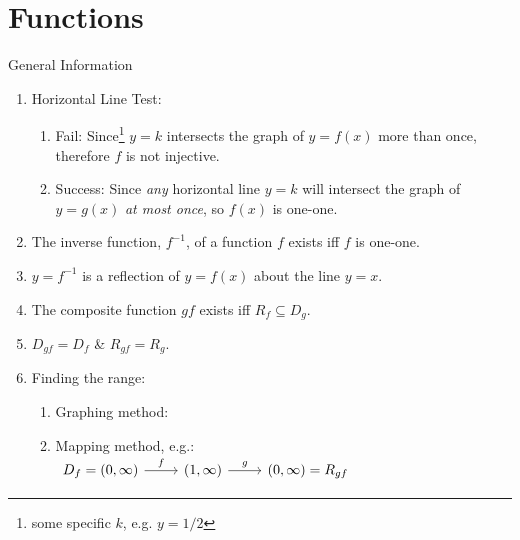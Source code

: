 \documentclass[oneside]{book}
\begin{document}
\chapter{Functions}
\begin{stbox}{General Information}
  \begin{enumerate}
    \item Horizontal Line Test: 
    \begin{enumerate}
      \item Fail: Since\footnote{some specific \(k\), e.g. \(y=1/2\)} \(y=k\) intersects the graph of \(y=f(x)\) more than once, therefore \(f\) is not injective.
      \item Success: Since \emph{any} horizontal line \(y=k\) will intersect the graph of \(y=g(x)\) \emph{at most once}, so \(f(x)\) is one-one.
    \end{enumerate}  
    \item The inverse function, \(f^{-1}\), of a function \(f\) exists iff \(f\) is one-one.
    \item \(y=f^{-1}\) is a reflection of \(y=f(x)\) about the line \(y=x\).
    \item The composite function \(gf\) exists iff \(R_f \subseteq D_g\).
    \item \(D_{gf}=D_f\) \& \(R_{gf}=R_g\).
    \item Finding the range:
    \begin{enumerate}
      \item Graphing method:
      \item Mapping method, e.g.: \(\begin{tikzcd}
        {D_f=(0, \infty)} & {(1,\infty)} & {(0,\infty)=R_{gf}} & {} & {}
        \arrow["f", from=1-1, to=1-2]
        \arrow["g", from=1-2, to=1-3]
      \end{tikzcd}\)
    \end{enumerate} 
  \end{enumerate}
\end{stbox}
\end{document}

